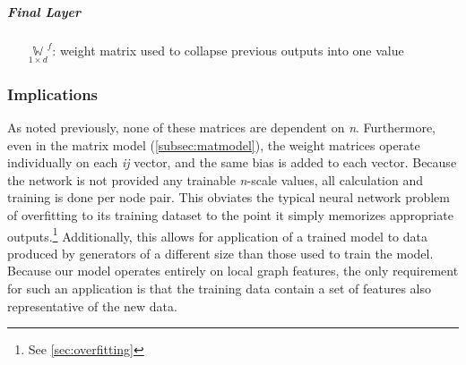 \subparagraph{Final Layer}
\begin{itemize}
	\item[$\underset{1 \times d}{\mathbb{W}}^f$:] weight matrix used to collapse 
		previous outputs into one value
\end{itemize}
\subsubsection{Implications}
As noted previously, none of these matrices are dependent on \textit{n}.  
Furthermore, even in the matrix model (\ref{subsec:matmodel}), the weight 
matrices operate individually on each \textit{ij} vector, and the same bias is 
added to each vector.  Because the network is not provided any trainable 
\textit{n}-scale values, all calculation and training is done per node pair.  
This obviates the typical neural network problem of overfitting to its training 
dataset to the point it simply memorizes appropriate outputs.\footnote{See 
\ref{sec:overfitting}} Additionally, this allows for application of a trained 
model to data produced by generators of a different size than those used to 
train the model. Because our model operates entirely on local graph features, 
the only requirement for such an application is that the training data contain a 
set of features also representative of the new data.
